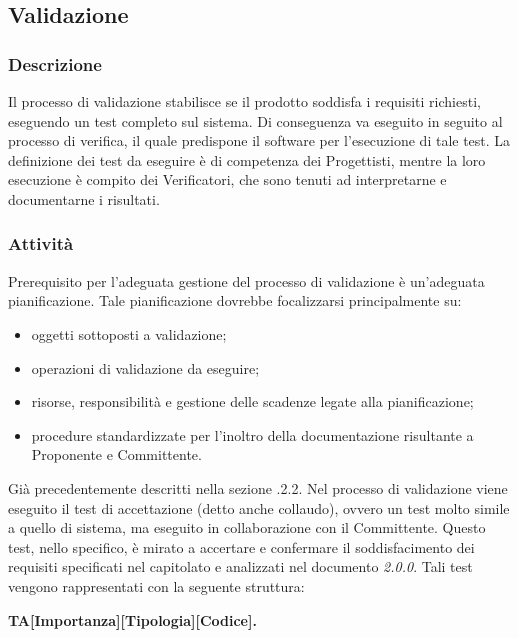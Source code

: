 \subsection{Validazione}
    \subsubsection{Descrizione}
      Il processo di validazione stabilisce se il prodotto soddisfa i requisiti richiesti, eseguendo un test completo sul sistema. Di conseguenza va eseguito in seguito al processo di verifica, il quale predispone il software per l'esecuzione di tale test. La definizione dei test da eseguire è di competenza dei Progettisti, mentre la loro esecuzione è compito dei Verificatori, che sono tenuti ad interpretarne e documentarne i risultati.
    \subsubsection{Attività}
      Prerequisito per l'adeguata gestione del processo di validazione è un'adeguata pianificazione. Tale pianificazione dovrebbe focalizzarsi principalmente su:
      \begin{itemize}
      	\item oggetti sottoposti a validazione;
      	\item operazioni di validazione da eseguire;
      	\item risorse, responsibilità e gestione delle scadenze legate alla pianificazione;
      	\item procedure standardizzate per l'inoltro della documentazione risultante a Proponente e Committente.
      \end{itemize}
      Già precedentemente descritti nella sezione .2.2.
      Nel processo di validazione viene eseguito il test di accettazione (detto anche collaudo), ovvero un test molto simile a quello di sistema, ma eseguito in collaborazione con il Committente. Questo test, nello specifico, è mirato a accertare e confermare il soddisfacimento dei requisiti specificati nel capitolato e analizzati nel documento \AdR{}\textit{2.0.0}. Tali test vengono rappresentati con la seguente struttura: \\
      \begin{center}
      	\textbf{TA[Importanza][Tipologia][Codice].}
      \end{center}     
